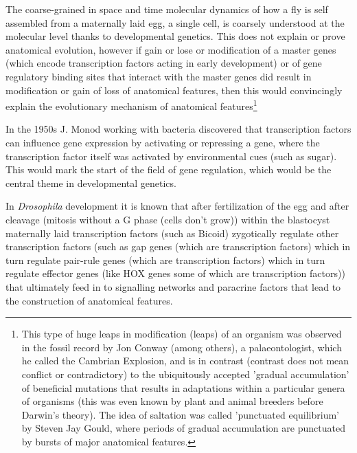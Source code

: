 The coarse-grained in space and time molecular dynamics of how a fly is self assembled from a maternally laid egg, a single cell, is coarsely understood at the molecular level thanks to developmental genetics.  This does not explain or prove anatomical evolution, however if gain or lose or modification of a master genes (which encode transcription factors acting in early development) or of gene regulatory binding sites that interact with the master genes did result in modification or gain of loss of anatomical features, then this would convincingly explain the evolutionary mechanism of anatomical features\footnote{This type of huge leaps in modification (leaps) of an organism was observed in the fossil record by Jon Conway (among others), a palaeontologist, which he called the Cambrian Explosion, and is in contrast (contrast does not mean conflict or contradictory) to the ubiquitously accepted 'gradual accumulation' of beneficial mutations that results in adaptations within a particular genera of organisms (this was even known by plant and animal breeders before Darwin's theory).  The idea of saltation was called 'punctuated equilibrium' by Steven Jay Gould, where periods of gradual accumulation are punctuated by bursts of major anatomical features.}  

In the 1950s J. Monod working with bacteria discovered that transcription factors can influence gene expression by activating or repressing a gene, where the transcription factor itself was activated by environmental cues (such as sugar).  This would mark the start of the field of gene regulation, which would be the central theme in developmental genetics.  


In \textit{Drosophila} development it is known that after fertilization of the egg and after cleavage (mitosis without a G phase (cells don't grow)) within the blastocyst maternally laid transcription factors (such as Bicoid) zygotically regulate other transcription factors (such as gap genes (which are transcription factors) which in turn regulate pair-rule genes (which are transcription factors) which in turn regulate effector genes (like HOX genes some of which are transcription factors)) that ultimately feed in to signalling networks and paracrine factors that lead to the construction of anatomical features.  

